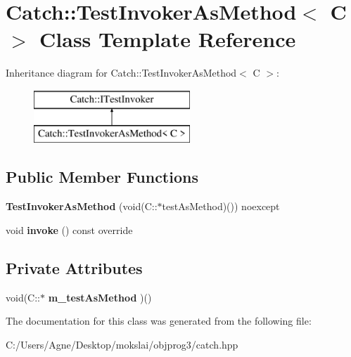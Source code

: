 \hypertarget{class_catch_1_1_test_invoker_as_method}{}\section{Catch\+:\+:Test\+Invoker\+As\+Method$<$ C $>$ Class Template Reference}
\label{class_catch_1_1_test_invoker_as_method}
Inheritance diagram for Catch\+:\+:Test\+Invoker\+As\+Method$<$ C $>$\+:\begin{figure}[H]
\begin{center}
\leavevmode
\includegraphics[height=2.000000cm]{class_catch_1_1_test_invoker_as_method}
\end{center}
\end{figure}
\subsection*{Public Member Functions}
\begin{DoxyCompactItemize}
\item 
\mbox{\label{class_catch_1_1_test_invoker_as_method_a119c4bdbbdd95c42859c18541987a1a4}} 
{\bfseries Test\+Invoker\+As\+Method} (void(C\+::$\ast$test\+As\+Method)()) noexcept
\item 
\mbox{\label{class_catch_1_1_test_invoker_as_method_a8115a06efe273f4112ec0b5452c1b5f2}} 
void {\bfseries invoke} () const override
\end{DoxyCompactItemize}
\subsection*{Private Attributes}
\begin{DoxyCompactItemize}
\item 
\mbox{\label{class_catch_1_1_test_invoker_as_method_a4851e50d6b43c022c41d5de776a27ed7}} 
void(C\+::$\ast$ {\bfseries m\+\_\+test\+As\+Method} )()
\end{DoxyCompactItemize}


The documentation for this class was generated from the following file\+:\begin{DoxyCompactItemize}
\item 
C\+:/\+Users/\+Agne/\+Desktop/mokslai/objprog3/catch.\+hpp\end{DoxyCompactItemize}
